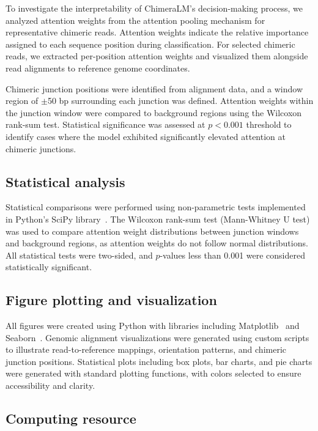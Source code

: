 \documentclass[pdflatex,sn-nature]{sn-jnl}%
\theoremstyle{thmstyleone}%
\theoremstyle{thmstyletwo}%
\theoremstyle{thmstylethree}%
\begin{document}
To investigate the interpretability of ChimeraLM's decision-making process, we analyzed attention weights from the attention pooling mechanism for representative chimeric reads.
Attention weights indicate the relative importance assigned to each sequence position during classification.
For selected chimeric reads, we extracted per-position attention weights and visualized them alongside read alignments to reference genome coordinates.

Chimeric junction positions were identified from alignment data, and a window region of $\pm$50 bp surrounding each junction was defined.
Attention weights within the junction window were compared to background regions using the Wilcoxon rank-sum test.
Statistical significance was assessed at $p < 0.001$ threshold to identify cases where the model exhibited significantly elevated attention at chimeric junctions.

\subsection*{Statistical analysis}

Statistical comparisons were performed using non-parametric tests implemented in Python's SciPy library~\cite{2020SciPy-NMeth}.
The Wilcoxon rank-sum test (Mann-Whitney U test) was used to compare attention weight distributions between junction windows and background regions, as attention weights do not follow normal distributions.
All statistical tests were two-sided, and $p$-values less than 0.001 were considered statistically significant.

\subsection*{Figure plotting and visualization}

All figures were created using Python with libraries including Matplotlib~\cite{Hunter2007} and Seaborn~\cite{Waskom2021}.
Genomic alignment visualizations were generated using custom scripts to illustrate read-to-reference mappings, orientation patterns, and chimeric junction positions.
Statistical plots including box plots, bar charts, and pie charts were generated with standard plotting functions, with colors selected to ensure accessibility and clarity.

\subsection*{Computing resource}
\end{document}
